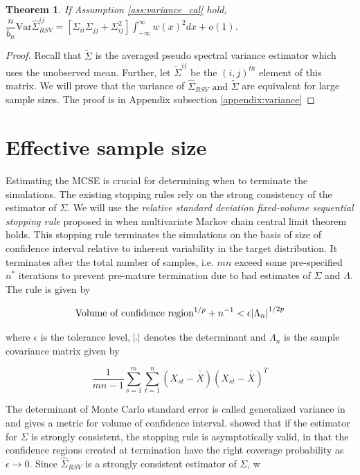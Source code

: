\documentclass[12pt]{article}
\newtheorem{theorem}{Theorem}
\newcommand{\Var}{\text{Var}}
\begin{document}
\bigskip

\begin{theorem} \label{th:rsv_variance}
 If Assumption \ref{ass:variance_cal} hold, $\dfrac{n}{b_n}\Var\hat{\Sigma}_{RSV}^{ij} = [\Sigma_{ii}\Sigma_{jj} + \Sigma_{ij}^2]\int_{-\infty}^{\infty}w(x)^2dx  + o(1)$.
\end{theorem}

\begin{proof}
Recall that $\tilde{\Sigma}$ is the averaged pseudo spectral variance estimator which uses the unobserved mean. Further, let $\tilde{\Sigma}^{ij}$ be the $(i,j)^{th}$ element of this matrix. We will prove that the variance of $\hat{\Sigma}_{RSV} \textrm{ and } \tilde{\Sigma}$ are equivalent for large sample sizes. The proof is in Appendix subsection \ref{appendix:variance}
\end{proof}


\section{Effective sample size} \label{sec:ess}

Estimating the MCSE is crucial for determining when to terminate the simulations. The existing stopping rules rely on the strong consistency of the estimator of $\Sigma$. We will use the \textit{relative standard deviation fixed-volume sequential stopping rule} proposed in \cite{vats2019multivariate} when multivariate Markov chain central limit theorem holds. This stopping rule terminates the simulations on the basis of size of confidence interval relative to inherent variability in the target distribution. It terminates after the total number of samples, i.e. $mn$ exceed some pre-specified $n^*$ iterations to prevent pre-mature termination due to bad estimates of $\Sigma$ and $\Lambda$. The rule is given by

\[
\textrm{Volume of confidence region}^{1/p} + n^{-1} < \epsilon \abs{\Lambda_n}^{1/2p} 
\]

where $\epsilon$ is the tolerance level, $\abs{.}$ denotes the determinant and $\Lambda_n$ is the sample covariance matrix given by

\[
\dfrac{1}{mn-1}\sum_{s=1}^{m}\sum_{t=1}^{n}(X_{st} - \overline{\overline{X}})(X_{st} - \overline{\overline{X}})^T
\]

The determinant of Monte Carlo standard error is called generalized variance in  \cite{wilks1932certain} and gives a metric for volume of confidence interval. \cite{vats2019multivariate} showed that if the estimator for $\Sigma$ is strongly consistent, the stopping rule is asymptotically valid, in that the confidence regions created at termination have the right coverage probability as $\epsilon \to 0$. Since $\hat{\Sigma}_{RSV}$ is a strongly consistent estimator of $\Sigma$, w
\end{document}
